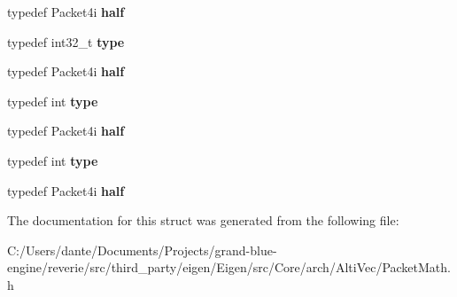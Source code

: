 \begin{DoxyCompactItemize}
typedef Packet4i {\bfseries half}
\item 
\mbox{\label{struct_eigen_1_1internal_1_1unpacket__traits_3_01_packet4i_01_4_a54f0c464c7741e90c57adfa7d635a9bf}} 
typedef int32\+\_\+t {\bfseries type}
\item 
\mbox{\label{struct_eigen_1_1internal_1_1unpacket__traits_3_01_packet4i_01_4_a75c567a3a2ec863be391967a237130df}} 
typedef Packet4i {\bfseries half}
\item 
\mbox{\label{struct_eigen_1_1internal_1_1unpacket__traits_3_01_packet4i_01_4_a1b7d1b039b266cdfbd6dc2fa4e811812}} 
typedef int {\bfseries type}
\item 
\mbox{\label{struct_eigen_1_1internal_1_1unpacket__traits_3_01_packet4i_01_4_a75c567a3a2ec863be391967a237130df}} 
typedef Packet4i {\bfseries half}
\item 
\mbox{\label{struct_eigen_1_1internal_1_1unpacket__traits_3_01_packet4i_01_4_a1b7d1b039b266cdfbd6dc2fa4e811812}} 
typedef int {\bfseries type}
\item 
\mbox{\label{struct_eigen_1_1internal_1_1unpacket__traits_3_01_packet4i_01_4_a75c567a3a2ec863be391967a237130df}} 
typedef Packet4i {\bfseries half}
\end{DoxyCompactItemize}


The documentation for this struct was generated from the following file\+:\begin{DoxyCompactItemize}
\item 
C\+:/\+Users/dante/\+Documents/\+Projects/grand-\/blue-\/engine/reverie/src/third\+\_\+party/eigen/\+Eigen/src/\+Core/arch/\+Alti\+Vec/Packet\+Math.\+h\end{DoxyCompactItemize}
